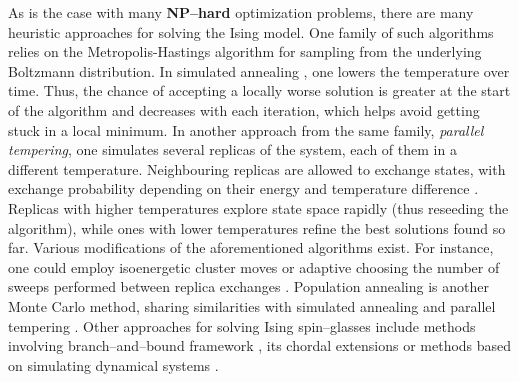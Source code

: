 As is the case with many \textbf{NP--hard} optimization problems, there are many heuristic
approaches for solving the Ising model. One family of such algorithms relies on the Metropolis-Hastings
\cite{beichl} algorithm for sampling from the underlying Boltzmann distribution. In simulated annealing
\cite{cook, isakov}, one lowers the temperature over time. Thus, the chance of accepting a locally
worse solution is greater at the start of the algorithm and decreases with each iteration, which
helps avoid getting stuck in a local minimum. In another approach from the same family,
\emph{parallel tempering}, one simulates several replicas of the system, each of them in a different
temperature. Neighbouring replicas are allowed to exchange states, with exchange probability
depending on their energy and temperature difference \cite{swendsen}. Replicas with higher
temperatures explore state space rapidly (thus reseeding the algorithm), while ones with lower
temperatures refine the best solutions found so far. Various modifications of the aforementioned
algorithms exist. For instance, one could employ isoenergetic cluster moves \cite{zhu} or adaptive
choosing the number of sweeps performed between replica exchanges \cite{bittner}. Population
annealing is another Monte Carlo method, sharing similarities with simulated annealing and parallel
tempering \cite{wang}. Other approaches for solving Ising spin--glasses include methods involving
branch--and--bound framework \cite{rendl}, its chordal extensions \cite{baccari} or methods based on
simulating dynamical systems \cite{sheldon}.
